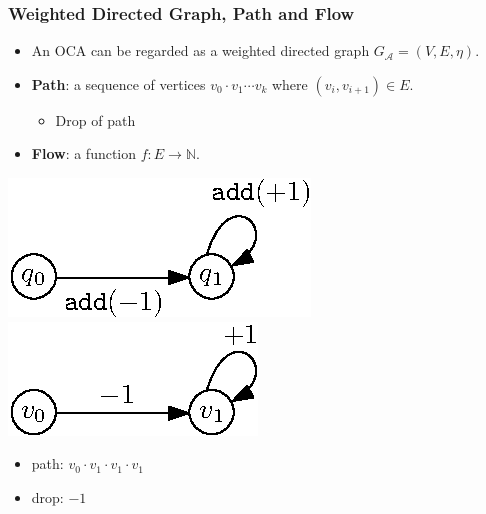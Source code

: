 \documentclass[11pt]{beamer}
\begin{document}
\begin{frame}\frametitle{Weighted Directed Graph,  Path and Flow}
\begin{itemize}

\item An OCA can be regarded as a weighted directed graph $G_\mathcal{A} = (V,E,\eta)$.
\pause
\item \textbf{Path}: a sequence of vertices $v_0\cdot v_1 \cdots v_k$ where $(v_i, v_{i+1}) \in E$.
\pause
\begin{itemize}
\item Drop of path
\end{itemize}
\pause
\item \textbf{Flow}: a function $f: E\rightarrow \mathbb{N}$.
\end{itemize}

\begin{example}
\begin{center}
\includegraphics[scale=1]{reachexample2.eps}
\includegraphics[scale=1]{wg.eps}
\begin{itemize}

\item path: $v_0\cdot v_1\cdot v_1\cdot v_1$
\item drop: $-1$
\end{itemize}
\end{center}


\end{example}
\end{frame}
\end{document}
